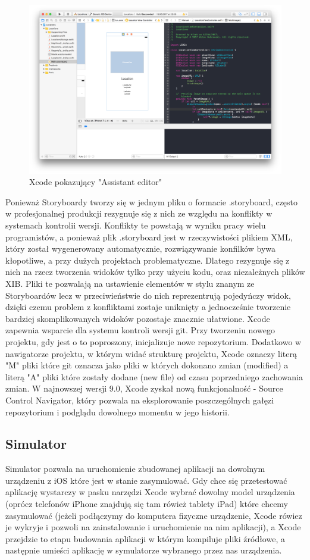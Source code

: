 \begin{figure}[ht!]
  \centering
  \includegraphics[width=120mm]{images/chapter-2-image-2-xcode.png}
  \caption{Xcode pokazujący "Assistant editor"}
  \label{chapter-2-image-2-xcode}
\end{figure}

Ponieważ Storyboardy tworzy się w jednym pliku o formacie .storyboard, często w profesjonalnej produkcji rezygnuje się z nich ze
względu na konflikty w systemach kontrolii wersji. Konflikty te powstają w wyniku pracy wielu programistów, a ponieważ plik .storyboard
jest w rzeczywistości plikiem XML, który został wygenerowany automatycznie, rozwiązywanie konfilków bywa kłopotliwe, a przy dużych
projektach problematyczne. Dlatego rezygnuje się z nich na rzecz tworzenia widoków tylko przy użyciu kodu, oraz niezależnych plików XIB.
Pliki te pozwalają na ustawienie elementów w stylu znanym ze Storyboardów lecz w przeciwieństwie do nich reprezentrują pojedyńczy widok,
dzięki czemu problem z konfliktami zostaje uniknięty a jednocześnie tworzenie bardziej skomplikowanych widoków pozostaje znacznie
ułatwione.
Xcode zapewnia wsparcie dla systemu kontroli wersji git. Przy tworzeniu nowego projektu, gdy jest o to poproszony, inicjalizuje nowe
repozytorium. Dodatkowo w nawigatorze projektu, w którym widać strukturę projektu, Xcode oznaczy literą "M" pliki które git oznacza
jako pliki w których dokonano zmian (modified) a literą "A" pliki które zostały dodane (new file) od czasu poprzedniego zachowania zmian.
W najnowszej wersji 9.0, Xcode zyskał nową funkcjonalność - Source Control Navigator, który pozwala na eksplorowanie poszczególnych
gałęzi repozytorium i podglądu dowolnego momentu w jego historii.

\subsection{Simulator}
Simulator pozwala na uruchomienie zbudowanej aplikacji na dowolnym urządzeniu z iOS które jest w stanie zasymulować. Gdy chce się
przetestować aplikację wystarczy w pasku narzędzi Xcode wybrać dowolny model urządzenia (oprócz telefonów iPhone znajdują się tam
rówież tablety iPad) które chcemy zasymulować (jeżeli podłączymy do komputera fizyczne urządzenie, Xcode rówiez je wykryje i pozwoli
na zainstalowanie i uruchomienie na nim aplikacji), a Xcode przejdzie to etapu budowania aplikacji w którym kompiluje pliki źródłowe,
a następnie umieści aplikację w symulatorze wybranego przez nas urządzenia.

